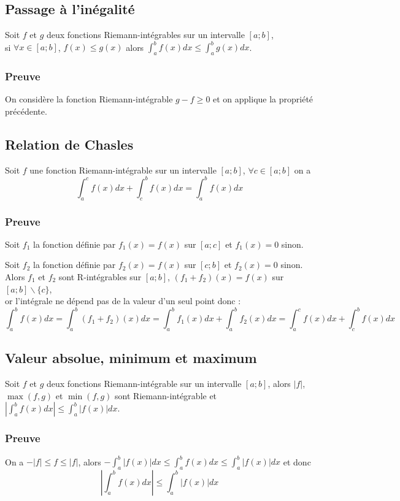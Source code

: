 \documentclass[a4paper,10pt]{book} %
\begin{document}
\subsection{Passage à l'inégalité}
Soit $f$ et $g$ deux fonctions Riemann-intégrables sur un intervalle $[a;b]$,\\
si $\forall x\in [a;b]$, $f(x)\leq g(x)$ alors $\displaystyle\int_{a}^{b} f(x)dx\leq \int_{a}^{b}g(x)dx$.

\subsubsection{Preuve}
On considère la fonction Riemann-intégrable $g-f\geq 0$ et on applique la propriété précédente.

\subsection{Relation de Chasles}
Soit $f$ une fonction Riemann-intégrable sur un intervalle $[a;b]$, $\forall c\in [a;b]$ on a $$\displaystyle\int_{a}^{c} f(x)dx+\int_{c}^{b}f(x)dx=\int_{a}^{b}f(x)dx$$

\subsubsection{Preuve}
Soit $f_1$ la fonction définie par $f_1(x)=f(x)$ sur $[a;c]$ et $f_1(x)=0$ sinon.

Soit $f_2$ la fonction définie par $f_2(x)=f(x)$ sur $[c;b]$ et $f_2(x)=0$ sinon.\\

Alors $f_1$ et $f_2$ sont R-intégrables sur $[a;b]$, $(f_1+f_2)(x)=f(x)$ sur $[a;b]\backslash\{c\}$,\\
or l'intégrale ne dépend pas de la valeur d'un seul point donc :
$$\displaystyle\int_{a}^{b}f(x)dx=\int_a^b (f_1+f_2)(x)dx=\int_{a}^{b}f_1(x)dx+\int_a^bf_2(x)dx=\int_{a}^{c}f(x)dx+\int_{c}^{b}f(x)dx$$

\newpage

\subsection{Valeur absolue, minimum et maximum}
Soit $f$ et $g$ deux fonctions Riemann-intégrable sur un intervalle $[a;b]$, alors $|f|$, $\max(f,g)$ et $\min(f,g)$ sont Riemann-intégrable et $\left|\displaystyle\int_{a}^{b}f(x)dx\right|\leq \displaystyle\int_{a}^{b}|f(x)|dx$.

\subsubsection{Preuve}
On a $-|f|\leq f\leq |f|$, alors $-\displaystyle\int_{a}^{b}|f(x)|dx\leq \int_{a}^{b}f(x)dx\leq \int_{a}^{b}|f(x)|dx$ et donc $$\left|\int_{a}^{b}f(x)dx\right|\leq \int_{a}^{b}|f(x)|dx$$\\
\end{document}
